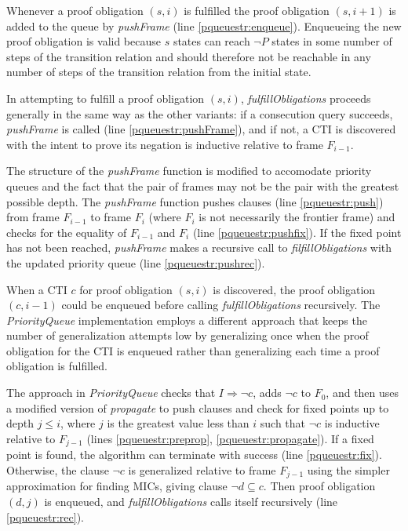 \documentclass[12pt,a4paper,twoside,openright]{report}
\begin{document}
{{Whenever a proof obligation $(s,i)$ is fulfilled the proof obligation
$(s, i + 1)$ is added to the queue by {\it pushFrame} (line \ref{pqueuestr:enqueue}).
Enqueueing the new proof obligation is valid
because $s$ states can reach $\neg P$ states in some
number of steps of the transition relation and should therefore
not be reachable in any number of steps of the transition relation from the initial state.

In attempting to fulfill a proof obligation $(s,i)$, {\it fulfillObligations} proceeds
generally in the same way as the other variants: if a consecution query succeeds,
{\it pushFrame} is called (line \ref{pqueuestr:pushFrame}), and if not, a CTI is discovered with the intent
to prove its negation is inductive relative to frame $F_{i - 1}$.

The structure of the {\it pushFrame} function is modified to
accomodate priority queues
and the fact that the pair of frames may not be the pair with the greatest possible depth.
The {\it pushFrame} function pushes clauses (line \ref{pqueuestr:push})
from frame $F_{i - 1}$ to frame $F_i$ (where
$F_i$ is not necessarily the frontier frame) and checks
for the equality of $F_{i - 1}$ and $F_i$ (line \ref{pqueuestr:pushfix}). If the fixed point has not been
reached, {\it pushFrame} makes a recursive call to {\it filfillObligations} with the updated
priority queue (line \ref{pqueuestr:pushrec}).

When a CTI $c$ for proof obligation $(s,i)$ is discovered, the proof obligation $(c,i - 1)$
could be enqueued before calling {\it fulfillObligations} recursively.
The \emph{PriorityQueue} implementation employs a different approach that keeps the number of
generalization attempts low by generalizing once when the proof obligation
for the CTI is enqueued rather than generalizing each time a proof obligation
is fulfilled.

The approach in \emph{PriorityQueue} checks
that $I \Rightarrow \neg c$, adds $\neg c$ to $F_0$, and then uses a modified
version of {\it propagate} to push clauses and check for fixed points up to
depth $j \leq i$, where $j$ is the greatest value less than $i$
such that $\neg c$ is inductive relative to $F_{j - 1}$
(lines \ref{pqueuestr:preprop}, \ref{pqueuestr:propagate}). If a fixed point is
found, the algorithm can terminate with success (line \ref{pqueuestr:fix}). Otherwise, the clause
$\neg c$ is generalized relative to frame $F_{j - 1}$
using the simpler approximation for finding MICs, giving clause
$\neg d \subseteq c$. Then proof obligation $(d,j)$ is enqueued, and
{\it fulfillObligations} calls itself recursively (line \ref{pqueuestr:rec}).

}}
\end{document}
